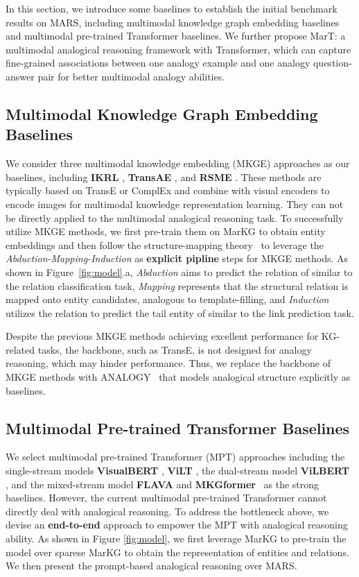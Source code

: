 \documentclass{article} \usepackage{iclr2023_conference,times}
\newcommand{\ours}{MarT}
\newcommand{\data}{MARS}
\newcommand{\kg}{MarKG}
\begin{document}
In this section, we introduce some baselines to establish the initial benchmark results on {\data}, including multimodal knowledge graph embedding baselines and multimodal pre-trained Transformer baselines. 
We further propose {\ours}: a multimodal analogical reasoning framework with Transformer, which can capture fine-grained associations between one analogy example and one analogy question-answer pair for better multimodal analogy abilities.


\subsection{Multimodal Knowledge Graph Embedding Baselines}

We consider three multimodal knowledge embedding (MKGE) approaches as our baselines, including \textbf{IKRL} \citep{IKRL}, \textbf{TransAE} \citep{TransAE},  and \textbf{RSME} \citep{RSME}.  
These methods are typically based on TransE \citep{TransE} or ComplEx \citep{complex} and combine with visual encoders to encode images for multimodal knowledge representation learning.
They can not be directly applied to the multimodal analogical reasoning task.
To successfully utilize MKGE methods, we first pre-train them on {\kg} to obtain entity embeddings and then follow the structure-mapping theory~\citep{minnameier2010abduction} to leverage the \textit{Abduction-Mapping-Induction} as \textbf{explicit
pipline} steps for MKGE methods.
As shown in Figure~\ref{fig:model}.a, \textit{Abduction} aims to predict the relation  of  similar to the relation classification task, \textit{Mapping} represents that the structural relation is mapped onto entity candidates, analogous to template-filling, and \textit{Induction} utilizes the relation  to predict the tail entity of  similar to the link prediction task.

Despite the previous MKGE methods achieving excellent performance for KG-related tasks, the backbone, such as TransE, is not designed for analogy reasoning, which may hinder performance. 
Thus, we replace the backbone of MKGE methods with ANALOGY~\cite{icml_analogy} that models analogical structure explicitly as baselines.
 

\subsection{Multimodal Pre-trained Transformer Baselines}
We select multimodal pre-trained Transformer (MPT) approaches including the single-stream models \textbf{VisualBERT} \citep{VisualBERT}, \textbf{ViLT} \citep{ViLT}, the dual-stream model \textbf{ViLBERT} \citep{ViLBERT}, and the mixed-stream model \textbf{FLAVA} \citep{FLAVA} and \textbf{MKGformer}~\cite{MKGformer} as the strong baselines.
However, the current multimodal pre-trained Transformer cannot directly deal with analogical reasoning.
To address the bottleneck above, we devise an \textbf{end-to-end} approach to empower the MPT with analogical reasoning ability.
As shown in Figure \ref{fig:model}, we first leverage {\kg} to pre-train the model over sparese {\kg} to obtain the representation of entities and relations. 
We then present the prompt-based analogical reasoning over {\data}.
\end{document}
